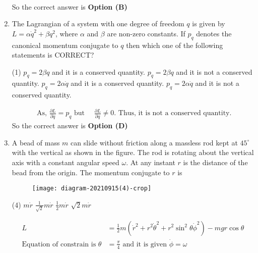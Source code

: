\begin{enumerate}
\begin{answer}
\begin{align*}
	\end{align*}
	So the correct answer is \textbf{Option (B)}
\end{answer}
	\item The Lagrangian of a system with one degree of freedom $q$ is given by $L=\alpha \dot{q}^{2}+\beta q^{2}$, where $\alpha$ and $\beta$ are non-zero constants. If $p_{q}$ denotes the canonical momentum conjugate to $q$ then which one of the following statements is CORRECT?
	{}
	\begin{tasks}(1)
		\task[\textbf{A.}] $p_{q}=2 \beta q$ and it is a conserved quantity.
		\task[\textbf{B.}]  $p_{q}=2 \beta q$ and it is not a conserved quantity.
		\task[\textbf{C.}] $p_{q}=2 \alpha \dot{q}$ and it is a conserved quantity.
		\task[\textbf{D.}]  $p_{q}=2 \alpha \dot{q}$ and it is not a conserved quantity.
	\end{tasks}
\begin{answer}
	\begin{align*}
	\text{	As, }\frac{\partial L}{\partial \dot{q}}=p_{q}\text{ but }\quad \frac{\partial L}{\partial q} \neq 0.\text{ Thus, it is not a conserved quantity.}
	\end{align*}
	So the correct answer is \textbf{Option (D)}
\end{answer}
	\item A bead of mass $m$ can slide without friction along a massless rod kept at $45^{\circ}$ with the vertical as shown in the figure. The rod is rotating about the vertical axis with a constant angular speed $\omega$. At any instant $r$ is the distance of the bead from the origin. The momentum conjugate to $r$ is
	{}
	\begin{figure}[H]
		\centering
		\texttt{[image: diagram-20210915(4)-crop]}
	\end{figure}
	\begin{tasks}(4)
		\task[\textbf{A.}] $m \dot{r}$
		\task[\textbf{B.}] $\frac{1}{\sqrt{2}} m \dot{r}$
		\task[\textbf{C.}] $\frac{1}{2} m \dot{r}$
		\task[\textbf{D.}] $\sqrt{2} m \dot{r}$
	\end{tasks}
\begin{answer}
	\begin{align*}
	L&=\frac{1}{2} m\left(\dot{r}^{2}+r^{2} \dot{\theta}^{2}+r^{2} \sin ^{2} \theta \dot{\phi}^{2}\right)-m g r \cos \theta\\
	\text{Equation of constrain is }\theta&=\frac{\pi}{4}\text{ and it is given } \dot{\phi}=\omega\\

\end{align*}
\end{answer}
\end{enumerate}
